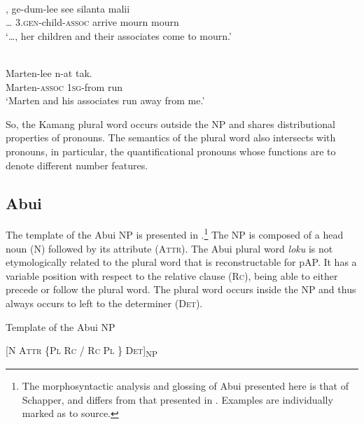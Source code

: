 \ea%
\label{ex:9:44}
 \\
\gll  {\dots},   ge-dum-lee see silanta malii \\
  {\dots} 3.\textsc{gen}-child-\textsc{assoc} arrive mourn mourn \\
\glt `{\dots}, her children and their associates come to mourn.'
\z







\ea%
\label{ex:9:45}
 \\
\gll  Marten-lee n-at tak.  \\
  Marten-\textsc{assoc} 1\textsc{sg}-from run   \\
\glt `Marten and his associates run away from me.'
\z






So, the Kamang plural word occurs outside the NP and shares distributional properties of pronouns. The semantics of the plural word also intersects with pronouns, in particular, the quantificational pronouns whose functions are to denote different number features.

\subsection{Abui} %
\label{sec:9:3.4}
The template of the Abui NP is presented in .\footnote{The morphosyntactic analysis and glossing of Abui presented here is that of Schapper, and differs from that presented in \citet{Kratochvil2007}. Examples are individually marked as to source.} The NP is composed of a head noun (N) followed by its attribute (\textsc{Attr).} The Abui plural word \textit{loku} is not etymologically related to the plural word that is reconstructable for pAP. It has a variable position with respect to the relative clause (\textsc{Rc}), being able to either precede or follow the plural word. The plural word occurs inside the NP and thus always occurs to left to the determiner (\textsc{Det).}

\ea%
\label{ex:9:46}
\upshape 
 Template of the Abui NP

[\textsc{N  Attr  \{Pl  Rc  /  Rc  Pl \} Det}]\textsubscript{NP}
\z

